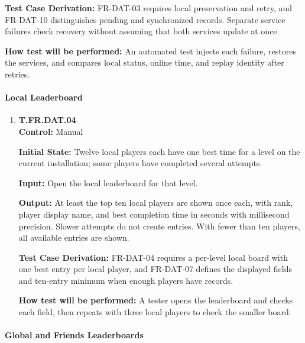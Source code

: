 \documentclass[12pt, titlepage]{article}
\begin{document}
{\begin{enumerate}
\textbf{Test Case Derivation:} \mbox{FR-DAT-03} requires local preservation and
retry, and \mbox{FR-DAT-10} distinguishes pending and synchronized records. Separate
service failures check recovery without assuming that both services update at once.

\textbf{How test will be performed:} An automated test injects each failure, restores
the services, and compares local status, online time, and replay identity after retries.

\end{enumerate}

\paragraph{Local Leaderboard}

\begin{enumerate}

\item{\hypertarget{test-fr-da04}{}\textbf{T.FR.DAT.04}\\}
\textbf{Control:} Manual

\textbf{Initial State:} Twelve local players each have one best time for a level on
the current installation; some players have completed several attempts.

\textbf{Input:} Open the local leaderboard for that level.

\textbf{Output:} At least the top ten local players are shown once each, with rank,
player display name, and best completion time in seconds with millisecond precision.
Slower attempts do not create entries. With fewer than ten players, all available
entries are shown.

\textbf{Test Case Derivation:} \mbox{FR-DAT-04} requires a per-level local board
with one best entry per local player, and \mbox{FR-DAT-07} defines the displayed fields and ten-entry
minimum when enough players have records.

\textbf{How test will be performed:} A tester opens the leaderboard and checks each
field, then repeats with three local players to check the smaller board.

\end{enumerate}

\paragraph{Global and Friends Leaderboards}

\begin{enumerate}


\end{enumerate}}
\end{document}
